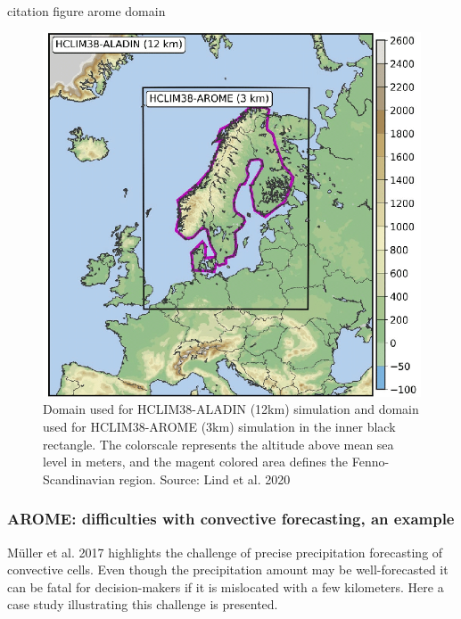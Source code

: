 \\
\cite{lind_arome} citation figure arome domain 
\begin{figure}[hbt!]
    \centering
    \includegraphics[scale=0.2]{figures/arome_domain.png}
    \caption{Domain used for HCLIM38-ALADIN (12km) simulation and domain used for HCLIM38-AROME (3km) simulation in the inner black rectangle. The colorscale represents the altitude above mean sea level in meters, and the magent colored area defines the Fenno-Scandinavian region. Source: Lind et al. 2020 \cite{lind_arome}}
    \label{fig:arome_domain}
\end{figure}

\subsubsection{AROME: difficulties with convective forecasting, an example}

M\"uller et al. 2017 \cite{muller} highlights the challenge of precise precipitation forecasting of convective cells. Even though the precipitation amount may be well-forecasted it can be fatal for decision-makers if it is mislocated with a few kilometers. Here a case study illustrating this challenge is presented. 

